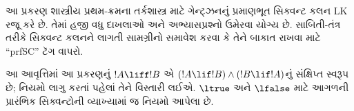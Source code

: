 \documentclass[../../../include/open-logic-chapter]{subfiles}
\begin{document}
      {}
      {}

\begin{editorial}
  આ પ્રકરણ શાસ્ત્રીય પ્રથમ-ક્રમના તર્કશાસ્ત્ર માટે ગેન્ટ્ઝનનું પ્રમાણભૂત
  સિક્વન્ટ કલન LK રજૂ કરે છે. તેમાં હજી વધુ દાખલાઓ અને
  અભ્યાસપ્રશ્નો ઉમેરવા યોગ્ય છે. સાબિતી-તંત્ર તરીકે સિક્વન્ટ કલનને લાગતી
  સામગ્રીનો સમાવેશ કરવા કે તેને બાકાત રાખવા માટે ``prfSC'' ટૅગ વાપરો.

આ આવૃત્તિમાં આ પ્રકરણનું $!A\liff!B$ એ
$(!A\lif!B)\land(!B\lif!A)$નું સંક્ષિપ્ત સ્વરૂપ છે; નિયમો લાગુ
કરતાં પહેલાં તેને વિસ્તારી લઈએ. $\ltrue$ અને $\lfalse$ માટે
આગળની પ્રારંભિક સિક્વન્ટોની વ્યાખ્યામાં જ નિયમો આપેલા છે.
\end{editorial}














\OLEndChapterHook
\end{document}
